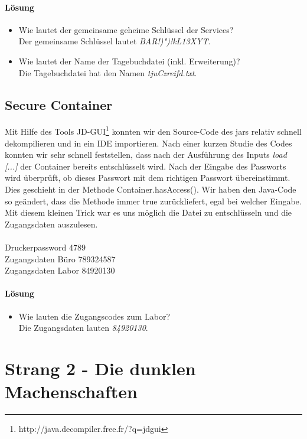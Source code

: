 \documentclass[12pt]{article}
\begin{document}
\paragraph{Lösung}
\begin{itemize}
	\item Wie lautet der gemeinsame geheime Schlüssel der Services? \\
		Der gemeinsame Schlüssel lautet \textit{BAR!)")!kL13XYT}.
	\item Wie lautet der Name der Tagebuchdatei (inkl. Erweiterung)?\\
		Die Tagebuchdatei hat den Namen \textit{tjuCzreifd.txt}.
\end{itemize}

\subsection{Secure Container}
Mit Hilfe des Tools JD-GUI\footnote{http://java.decompiler.free.fr/?q=jdgui} konnten wir den Source-Code des jars relativ schnell dekompilieren und in ein IDE importieren. Nach einer kurzen Studie des Codes konnten wir sehr schnell feststellen, dass nach der Ausführung des Inputs \emph{load [...]} der Container bereits entschlüsselt wird. Nach der Eingabe des Passworts wird überprüft, ob dieses Passwort mit dem richtigen Passwort übereinstimmt. Dies geschieht in der Methode Container.hasAccess(). Wir haben den Java-Code so geändert, dass die Methode immer true zurückliefert, egal bei welcher Eingabe. Mit diesem kleinen Trick war es uns möglich die Datei zu entschlüsseln und die Zugangsdaten auszulesen. \\
 \\
Druckerpassword 4789\\
Zugangsdaten Büro 789324587\\
Zugangsdaten Labor 84920130

\paragraph{Lösung}
\begin{itemize}
	\item Wie lauten die Zugangscodes zum Labor?\\
		Die Zugangsdaten lauten \textit{84920130}.
\end{itemize}

\newpage
\section{Strang 2 - Die dunklen Machenschaften}
\end{document}
